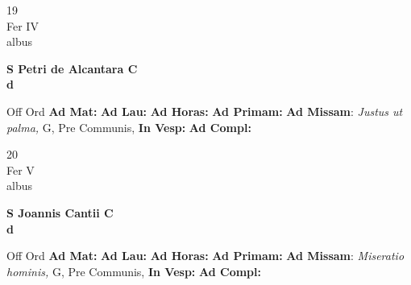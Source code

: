 \documentclass[10pt, openany]{book}
\begin{document}
    \begin{center}
        \begin{minipage}{3.5in}
            \vspace{2em}
            \begin{minipage}{0.5in}
                {\Huge 19} \\
                {\normalsize Fer IV} \\
                {\normalsize albus}
            \end{minipage}
            \begin{minipage}{3.0in}
                \textbf{ \large S Petri de Alcantara C \\
                \textnormal{\normalsize d}} \\ 
            \end{minipage}
            \begin{justify}Off Ord
                \textbf{Ad Mat: }
                \textbf{Ad Lau: }
                \textbf{Ad Horas: }
                \textbf{Ad Primam: }\textbf{Ad Missam}: \textit{Justus ut palma,} G, Pre Communis,  
                \textbf{In Vesp: }
                \textbf{Ad Compl: }
            \end{justify}
        \end{minipage}
    \end{center}

    \begin{center}
        \begin{minipage}{3.5in}
            \vspace{2em}
            \begin{minipage}{0.5in}
                {\Huge 20} \\
                {\normalsize Fer V} \\
                {\normalsize albus}
            \end{minipage}
            \begin{minipage}{3.0in}
                \textbf{ \large S Joannis Cantii C \\
                \textnormal{\normalsize d}} \\ 
            \end{minipage}
            \begin{justify}Off Ord
                \textbf{Ad Mat: }
                \textbf{Ad Lau: }
                \textbf{Ad Horas: }
                \textbf{Ad Primam: }\textbf{Ad Missam}: \textit{Miseratio hominis,} G, Pre Communis,  
                \textbf{In Vesp: }
                \textbf{Ad Compl: }
            \end{justify}
        \end{minipage}
    \end{center}
\end{document}
